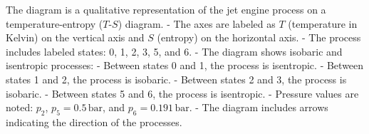 The diagram is a qualitative representation of the jet engine process on a temperature-entropy (\(T\)-\(S\)) diagram.  
- The axes are labeled as \(T\) (temperature in Kelvin) on the vertical axis and \(S\) (entropy) on the horizontal axis.  
- The process includes labeled states: 0, 1, 2, 3, 5, and 6.  
- The diagram shows isobaric and isentropic processes:  
  - Between states 0 and 1, the process is isentropic.  
  - Between states 1 and 2, the process is isobaric.  
  - Between states 2 and 3, the process is isobaric.  
  - Between states 5 and 6, the process is isentropic.  
- Pressure values are noted: \(p_2\), \(p_5 = 0.5 \, \text{bar}\), and \(p_6 = 0.191 \, \text{bar}\).  
- The diagram includes arrows indicating the direction of the processes.